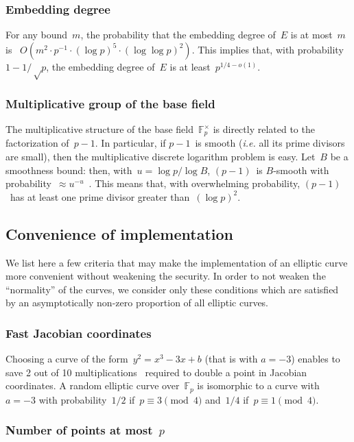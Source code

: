 \documentclass[twocolumn,letterpaper]{article}
\def\F{\mathbb{F}}
\begin{document}
\subsubsection{Embedding degree}

For any bound~$m$, the probability that
the embedding degree of~$E$ is at most~$m$
is~\cite{jc1998bk} $O(m^2 · p^{-1}·(\log p)^5·(\log\log p)^2)$.
This implies that, with probability~$1 - 1/√p$,
the embedding degree of~$E$ is at least~$p^{1/4 - o(1)}$.

\subsubsection{Multiplicative group of the base field}

The multiplicative structure of the base field~$\F_p^{×}$
is directly related to the factorization of~$p-1$.
In particular, if $p-1$~is smooth
(\emph{i.e.} all its prime divisors are small),
then the multiplicative discrete logarithm problem is easy.
Let~$B$ be a smoothness bound: then, with~$u = \log p / \log B$,
$(p-1)$~is $B$-smooth with probability~$≈ u^{-u}$~\cite{jnt1983cep}.
This means that, with overwhelming probability,
$(p-1)$~has at least one prime divisor greater than~$(\log p)^2$.

\subsection{Convenience of implementation}
\label{ss:convenience}

We list here a few criteria that
may make the implementation of an elliptic curve more convenient
without weakening the security.
In order to not weaken the ``normality'' of the curves,
we consider only these conditions which are satisfied
by an asymptotically non-zero proportion of all elliptic curves.

\subsubsection{Fast Jacobian coordinates}

Choosing a curve of the form~$y^2 = x^3 - 3 x + b$ (that is with $a=-3$)
enables to save 2 out of 10 multiplications~\cite{ieeep1363}
required to double a point in Jacobian coordinates.
A random elliptic curve over~$\F_p$
is isomorphic to a curve with~$a = -3$
with probability~$1/2$ if~$p ≡ 3 \pmod{4}$ and~$1/4$ if~$p ≡ 1 \pmod{4}$.

\subsubsection{Number of points at most~\texorpdfstring{$p$}{p}}
\end{document}
